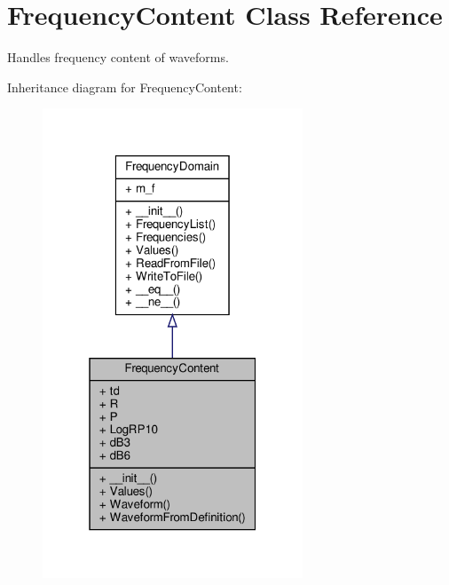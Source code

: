 \hypertarget{classSignalIntegrity_1_1FrequencyDomain_1_1FrequencyContent_1_1FrequencyContent}{}\section{Frequency\+Content Class Reference}
\label{classSignalIntegrity_1_1FrequencyDomain_1_1FrequencyContent_1_1FrequencyContent}


Handles frequency content of waveforms.  




Inheritance diagram for Frequency\+Content\+:
\nopagebreak
\begin{figure}[H]
\begin{center}
\leavevmode
\includegraphics[width=220pt]{classSignalIntegrity_1_1FrequencyDomain_1_1FrequencyContent_1_1FrequencyContent__inherit__graph}
\end{center}
\end{figure}


